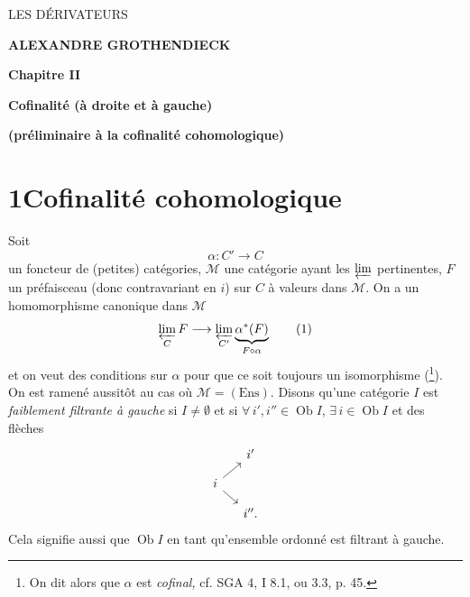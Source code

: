 \documentclass[11pt]{article}
\newcommand{\printedpage}[1]{\marginpar{\footnotesize p.~#1}}
\newcommand{\msp}[1]{\marginpar{\footnotesize [#1]}}
\begin{document}
\printedpage{--}

\begin{center}
\vspace*{4cm}
{\Large\textsf{LES DÉRIVATEURS}}

\bigskip\bigskip

\textbf{ALEXANDRE GROTHENDIECK}

\bigskip\bigskip\bigskip

\textbf{Chapitre II}

\textbf{Cofinalité (à droite et à gauche)}

\textbf{(préliminaire à la cofinalité cohomologique)}
\end{center}

\clearpage


\printedpage{1}

\msp{page 1}

\section*{1\quad Cofinalité cohomologique}

Soit
\[ \alpha : C' \longrightarrow C \]
un foncteur de (petites) catégories, $\mathcal{M}$ une catégorie ayant les $\varprojlim$ pertinentes, $F$ un préfaisceau (donc contravariant en $i$) sur $C$ à valeurs dans $\mathcal{M}$. On a un homomorphisme canonique dans $\mathcal{M}$
\[ \varprojlim_{C} F \longrightarrow \varprojlim_{C'} \underbrace{\alpha^*(F)}_{F\circ\alpha} \tag*{(1)} \]
et on veut des conditions sur $\alpha$ pour que ce soit toujours un isomorphisme (\footnote{On dit alors que $\alpha$ est \textit{cofinal,} cf. SGA 4, I 8.1, ou 3.3, p. 45.}). On est ramené aussitôt au cas où $\mathcal{M} = (\mathrm{Ens})$. Disons qu'une catégorie $I$ est \textit{faiblement filtrante à gauche} si $I \neq \emptyset$ et si $\forall\, i', i'' \in \operatorname{Ob} I$, $\exists\, i \in \operatorname{Ob} I$ et des flèches
\[
\begin{tikzcd}[row sep=small, column sep=small]
 & i' \\
i \arrow[ur] \arrow[dr] & \\
 & i''.
\end{tikzcd}
\]
Cela signifie aussi que $\operatorname{Ob} I$ en tant qu'ensemble ordonné est filtrant à gauche.
\end{document}
